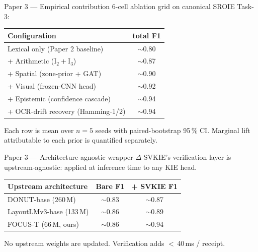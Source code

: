 \documentclass{beamer}
\begin{document}
\begin{frame}{Paper 3 --- Empirical contribution}
  6-cell ablation grid on canonical SROIE Task-3:
  \vspace{0.5em}
  \small
  \begin{tabular}{lc}
    \toprule
    Configuration & \textsf{total} F1 \\ \midrule
    Lexical only (Paper 2 baseline)              & $\sim$0.80 \\
    + Arithmetic ($\mathrm{I}_2 + \mathrm{I}_3$) & $\sim$0.87 \\
    + Spatial (zone-prior + GAT)                 & $\sim$0.90 \\
    + Visual (frozen-CNN head)                   & $\sim$0.92 \\
    + Epistemic (confidence cascade)             & $\sim$0.94 \\
    + OCR-drift recovery (Hamming-1/2)           & $\sim$0.94 \\
    \bottomrule
  \end{tabular}
  \vspace{0.5em}
  \footnotesize
  Each row is mean over $n=5$ seeds with paired-bootstrap 95\,\% CI.
  Marginal lift attributable to each prior is quantified separately.
\end{frame}

\begin{frame}{Paper 3 --- Architecture-agnostic wrapper-$\Delta$}
  SVKIE's verification layer is upstream-agnostic: applied at inference
  time to any KIE head.
  \vspace{0.5em}
  \small
  \begin{tabular}{lcc}
    \toprule
    Upstream architecture & Bare F1 & + SVKIE F1 \\ \midrule
    DONUT-base (260\,M)         & $\sim$0.83 & $\sim$0.87 \\
    LayoutLMv3-base (133\,M)    & $\sim$0.86 & $\sim$0.89 \\
    FOCUS-T (66\,M, ours)       & $\sim$0.86 & $\sim$0.94 \\
    \bottomrule
  \end{tabular}
  \vspace{0.5em}
  No upstream weights are updated.  Verification adds
  $<$\,40\,ms / receipt.
\end{frame}

\end{document}
